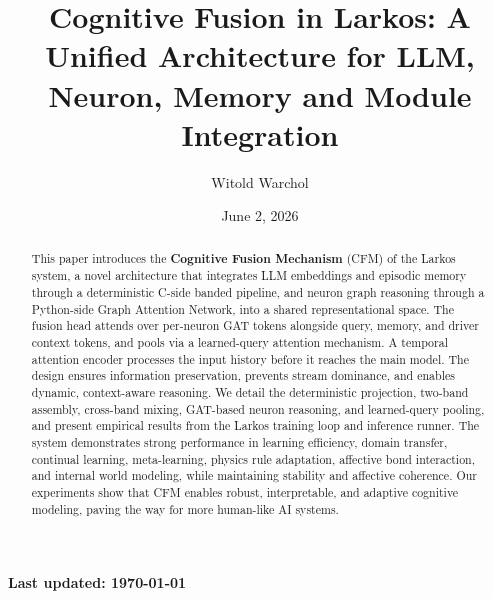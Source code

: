 \documentclass[12pt]{article}
\title{Cognitive Fusion in Larkos: A Unified Architecture for LLM,
Neuron, Memory and Module Integration}
\author{Witold Warchol{}}
\date{June 2, 2026}
\begin{document}
\maketitle

\textbf{Last updated: \today}

\begin{abstract}
This paper introduces the \textbf{Cognitive Fusion Mechanism} (CFM)
of the Larkos system, a novel architecture that integrates LLM
embeddings and episodic memory through a deterministic C-side banded
pipeline, and neuron graph reasoning through a Python-side Graph
Attention Network, into a shared representational space. The fusion
head attends over per-neuron GAT tokens alongside query, memory, and
driver context tokens, and pools via a learned-query attention mechanism.
A temporal attention encoder processes the input history before it
reaches the main model. The design ensures information preservation,
prevents stream dominance, and enables dynamic, context-aware reasoning.
We detail the deterministic projection, two-band assembly, cross-band
mixing, GAT-based neuron reasoning, and learned-query pooling, and
present empirical results from the Larkos training loop and inference
runner. The system demonstrates strong performance in learning
efficiency, domain transfer, continual learning, meta-learning, physics
rule adaptation, affective bond interaction, and internal world modeling,
while maintaining stability and affective coherence. Our experiments
show that CFM enables robust, interpretable, and adaptive cognitive
modeling, paving the way for more human-like AI systems.
\end{abstract}
\end{document}
